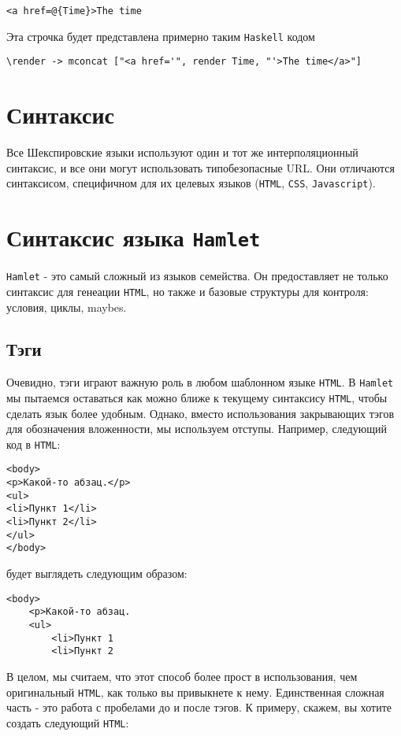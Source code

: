 \begin{lstlisting}
<a href=@{Time}>The time
\end{lstlisting}

Эта строчка будет представлена примерно таким \texttt{Haskell} кодом

\begin{lstlisting}
\render -> mconcat ["<a href='", render Time, "'>The time</a>"]
\end{lstlisting}

\section{Синтаксис}
Все Шекспировские языки используют один и тот же интерполяционный синтаксис,
и все они могут использовать типобезопасные URL. Они отличаются синтаксисом,
специфичном для их целевых языков (\texttt{HTML}, \texttt{CSS}, \texttt{Javascript}).

\section{Синтаксис языка \texttt{Hamlet}}
\texttt{Hamlet} - это самый сложный из языков семейства. Он предоставляет не только
синтаксис для генеации \texttt{HTML}, но также и базовые структуры для контроля:
условия, циклы, maybes.

\subsection{Тэги}
Очевидно, тэги играют важную роль в любом шаблонном языке \texttt{HTML}. В \texttt{Hamlet}
мы пытаемся оставаться как можно ближе к текущему синтаксису \texttt{HTML}, чтобы
сделать язык более удобным. Однако, вместо использования закрывающих тэгов
для обозначения вложенности, мы используем отступы. Например, следующий код
в \texttt{HTML}:

\begin{lstlisting}
<body>
<p>Какой-то абзац.</p>
<ul>
<li>Пункт 1</li>
<li>Пункт 2</li>
</ul>
</body>
\end{lstlisting}

будет выглядеть следующим образом:
\begin{lstlisting}
<body>
    <p>Какой-то абзац.
    <ul>
        <li>Пункт 1
        <li>Пункт 2
\end{lstlisting}

В целом, мы считаем, что этот способ более прост в использования, чем
оригинальный \texttt{HTML}, как только вы привыкнете к нему. Единственная сложная часть
 - это работа с пробелами до и после тэгов. К примеру, скажем, вы хотите
создать следующий \texttt{HTML}:

